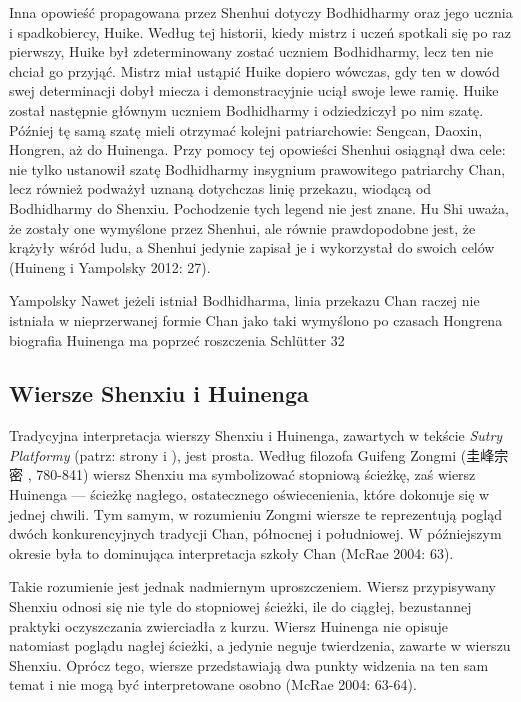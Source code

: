 
Inna opowieść propagowana przez Shenhui dotyczy Bodhidharmy oraz jego ucznia i spadkobiercy, Huike. Według tej historii, kiedy mistrz i uczeń spotkali się po raz pierwszy, Huike był zdeterminowany zostać uczniem Bodhidharmy, lecz ten nie chciał go przyjąć. Mistrz miał ustąpić Huike dopiero wówczas, gdy ten w dowód swej determinacji dobył miecza i demonstracyjnie uciął swoje lewe ramię. Huike został następnie głównym uczniem Bodhidharmy i odziedziczył po nim szatę. Później tę samą szatę mieli otrzymać kolejni patriarchowie: Sengcan, Daoxin, Hongren, aż do Huinenga. Przy pomocy tej opowieści Shenhui osiągnął dwa cele: nie tylko ustanowił szatę Bodhidharmy insygnium prawowitego patriarchy Chan, lecz również podważył uznaną dotychczas linię przekazu, wiodącą od Bodhidharmy do Shenxiu. Pochodzenie tych legend nie jest znane. Hu Shi uważa, że zostały one wymyślone przez Shenhui, ale równie prawdopodobne jest, że krążyły wśród ludu, a Shenhui jedynie zapisał je i wykorzystał do swoich celów (Huineng i Yampolsky 2012: 27).

Yampolsky
Nawet jeżeli istniał Bodhidharma, linia przekazu Chan raczej nie istniała w nieprzerwanej formie
Chan jako taki wymyślono po czasach Hongrena
biografia Huinenga ma poprzeć roszczenia
Schlütter 32
\fi

\subsection{Wiersze Shenxiu i Huinenga}
Tradycyjna interpretacja wierszy Shenxiu i Huinenga, zawartych w tekście \textit{Sutry Platformy} (patrz: strony \pageref{ShenxiuVerse} i \pageref{HuinengVerse}), jest prosta.
Według filozofa Guifeng Zongmi (圭峰宗密 , 780-841) wiersz Shenxiu ma symbolizować stopniową ścieżkę, zaś wiersz Huinenga --- ścieżkę nagłego, ostatecznego oświecenienia, które dokonuje się w jednej chwili.
Tym samym, w rozumieniu Zongmi wiersze te reprezentują pogląd dwóch konkurencyjnych tradycji Chan, północnej i południowej.
W późniejszym okresie była to dominująca interpretacja szkoły Chan
(McRae 2004: 63).

Takie rozumienie jest jednak nadmiernym uproszczeniem. Wiersz przypisywany Shenxiu odnosi się nie tyle do stopniowej ścieżki, ile do ciągłej, bezustannej praktyki oczyszczania zwierciadła z kurzu.
Wiersz Huinenga nie opisuje natomiast poglądu nagłej ścieżki, a jedynie neguje twierdzenia, zawarte w wierszu Shenxiu.
Oprócz tego, wiersze przedstawiają dwa punkty widzenia na ten sam temat i nie mogą być interpretowane osobno
(McRae 2004: 63-64).

